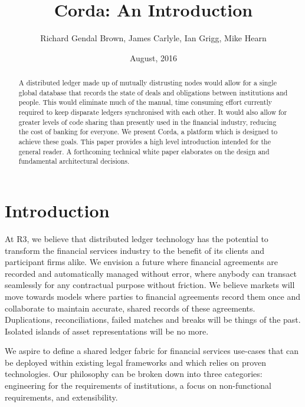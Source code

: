 \documentclass{article}
\author{Richard Gendal Brown, James Carlyle, Ian Grigg, Mike Hearn}
\date{August, 2016}
\title{Corda: An Introduction}
\begin{document}
\maketitle 



\begin{abstract}

A distributed ledger made up of mutually distrusting nodes would allow for a single global database that records the state of deals and obligations between institutions and people. This would eliminate much of the manual, time consuming effort currently required to keep disparate ledgers synchronised with each other. It would also allow for greater levels of code sharing than presently used in the financial industry, reducing the cost of banking for everyone. We present Corda, a platform which is designed to achieve these goals. This paper provides a high level introduction intended for the general reader. A forthcoming technical white paper elaborates on the design and fundamental architectural decisions.
\end{abstract}
\newpage
\tableofcontents
\newpage
\section{Introduction}
At R3, we believe that distributed ledger technology has the potential to transform the financial services industry to the benefit of its clients and participant firms alike. We envision a future where financial agreements are recorded and automatically managed without error, where anybody can transact seamlessly for any contractual purpose without friction. We believe markets will move towards models where parties to financial agreements record them once and collaborate to maintain accurate, shared records of these agreements. Duplications, reconciliations, failed matches and breaks will be things of the past. Isolated islands of asset representations will be no more.

We aspire to define a shared ledger fabric for financial services use-cases that can be deployed within existing legal frameworks and which relies on proven technologies. Our philosophy can be broken down into three categories: engineering for the requirements of institutions, a focus on non-functional requirements, and extensibility.
\end{document}
